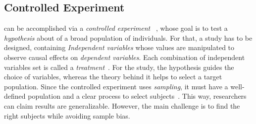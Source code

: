   \subsection{Controlled Experiment}
  \MethodologyStep

   can be accomplished via a \emph{controlled experiment}%
  ~\parencite{Easterbrook2008SelectingEngineering}, whose goal is to 
  test a \emph{hypothesis} about of a broad population of individuals.
  For that, a study has to be designed, containing
  \emph{Independent variables} whose values are manipulated
  to observe causal effects on \emph{dependent variables}.
  Each combination of independent variables set is called
  a \emph{treatment}~\parencite{Easterbrook2008SelectingEngineering}.
  For the study, the hypothesis guides the choice of variables,
  whereas the theory behind it helps to select a target population.
  Since the controlled experiment uses \emph{sampling},
  it must have a well-defined population and a clear process
  to select subjects~\parencite{Easterbrook2008SelectingEngineering}.
  This way, researchers can claim results are generalizable.
  However, the main challenge is to find the right subjects
  while avoiding sample bias.

